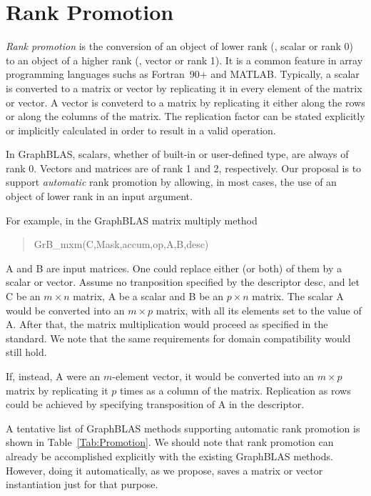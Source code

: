 \section{Rank Promotion}
\label{Sec:promotion}

\renewcommand{\vector}[1]{{\bf #1}}
\renewcommand{\matrix}[1]{{\bf #1}}

\emph{Rank promotion} is the conversion of an object of lower rank (\eg,
scalar or rank 0) to an object of a higher rank (\eg, vector or rank 1).
It is a common feature in array programming languages suchs as Fortran~90+
and MATLAB.  Typically, a scalar is converted to a matrix or vector
by replicating it in every element of the matrix or vector. A vector is
conveterd to a matrix by replicating it either along the rows or along the
columns of the matrix.  The replication factor can be stated explicitly
or implicitly calculated in order to result in a valid operation.

In GraphBLAS, scalars, whether of built-in or user-defined type, are
always of rank 0. Vectors and matrices are of rank 1 and 2, respectively.
Our proposal is to support \emph{automatic} rank promotion by allowing,
in most cases, the use of an object of lower rank in an input argument.

For example, in the GraphBLAS matrix multiply method 
\begin{quote} 
{\sf GrB\_mxm(C,Mask,accum,op,A,B,desc)}
\end{quote}
{\sf A} and {\sf B} are input matrices. One could replace either (or both)
of them by a scalar or vector.  Assume no tranposition specified by the
descriptor {\sf desc}, and let {\sf C} be an $m \times n$ matrix, {\sf A}
be a scalar and {\sf B} be an $p \times n$ matrix. The scalar {\sf A}
would be converted into an $m \times p$ matrix, with all its elements
set to the value of {\sf A}.  After that, the matrix multiplication would
proceed as specified in the standard.  We note that the same requirements
for domain compatibility would still hold.

If, instead, {\sf A} were an $m$-element vector, it would be converted into
an $m \times p$ matrix by replicating it $p$ times as a column of the matrix.
Replication as rows could be achieved by specifying transposition of
{\sf A} in the descriptor.

A tentative list of GraphBLAS methods supporting automatic rank
promotion is shown in Table~\ref{Tab:Promotion}. We should note that 
rank promotion can already be accomplished explicitly with the existing
GraphBLAS methods. However, doing it automatically, as we propose,
saves a matrix or vector instantiation just for that purpose.

